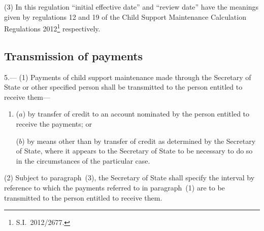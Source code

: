 \documentclass[12pt,a4paper]{article}
\begin{document}
(3) In this regulation “initial effective date” and “review date” have the meanings given by regulations 12 and 19 of the Child Support Maintenance Calculation Regulations 2012\footnote{S.I.~2012/2677.} respectively.


\subsection[5. Transmission of payments]{Transmission of payments}

5.—%
%
%
%
(1) Payments of child support maintenance made through the Secretary of State or other specified person shall be transmitted to the person entitled to receive them---
\begin{enumerate}\item[]
($a$) by transfer of credit to an account nominated by the person entitled to receive the payments; or

($b$) by means other than by transfer of credit as determined by the Secretary of State, where it appears to the Secretary of State to be necessary to do so in the circumstances of the particular case.
\end{enumerate}

(2) 
Subject to paragraph~(3), the Secretary of State  %
shall specify the interval by reference to which the payments referred to in paragraph~(1) are to be transmitted to the person entitled to receive them.
\end{document}
